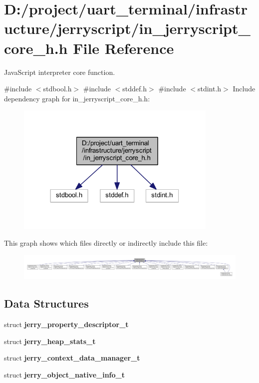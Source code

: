 \section{D\+:/project/uart\+\_\+terminal/infrastructure/jerryscript/in\+\_\+jerryscript\+\_\+core\+\_\+h.h File Reference}
\label{in__jerryscript__core__h_8h}


Java\+Script interpreter core function.  


{\ttfamily \#include $<$stdbool.\+h$>$}\newline
{\ttfamily \#include $<$stddef.\+h$>$}\newline
{\ttfamily \#include $<$stdint.\+h$>$}\newline
Include dependency graph for in\+\_\+jerryscript\+\_\+core\+\_\+h.\+h\+:\nopagebreak
\begin{figure}[H]
\begin{center}
\leavevmode
\includegraphics[width=273pt]{in__jerryscript__core__h_8h__incl}
\end{center}
\end{figure}
This graph shows which files directly or indirectly include this file\+:\nopagebreak
\begin{figure}[H]
\begin{center}
\leavevmode
\includegraphics[width=350pt]{in__jerryscript__core__h_8h__dep__incl}
\end{center}
\end{figure}
\subsection*{Data Structures}
\begin{DoxyCompactItemize}
\item 
struct \textbf{ jerry\+\_\+property\+\_\+descriptor\+\_\+t}
\item 
struct \textbf{ jerry\+\_\+heap\+\_\+stats\+\_\+t}
\item 
struct \textbf{ jerry\+\_\+context\+\_\+data\+\_\+manager\+\_\+t}
\item 
struct \textbf{ jerry\+\_\+object\+\_\+native\+\_\+info\+\_\+t}
\end{DoxyCompactItemize}
